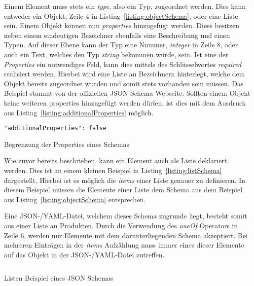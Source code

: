 Einem Element muss stets ein \textit{type}, also ein Typ, zugeordnet werden.
Dies kann entweder ein Objekt, Zeile 4 in Listing~\ref{listing:objectSchema}, oder eine Liste sein.
Einem Objekt können nun \textit{properties} hinzugefügt werden.
Diese besitzen neben einem eindeutigen Bezeichner ebenfalls eine Beschreibung und einen Typen.
Auf dieser Ebene kann der Typ eine Nummer, \textit{integer} in Zeile 8, oder auch ein Text, welches den Typ \textit{string} bekommen würde, sein.
Ist eine der \textit{Properties} ein notwendiges Feld, kann dies mittels des Schlüsselwortes \textit{required} realisiert werden.
Hierbei wird eine Liste an Bezeichnern hinterlegt, welche dem Objekt bereits zugeordnet wurden und somit stets vorhanden sein müssen.
Das Beispiel stammt von der offiziellen JSON Schema Webseite.\cite*{schemaExample}
Sollten einem Objekt keine weiteren properties hinzugefügt werden dürfen, ist dies mit dem Ausdruck aus Listing~\ref{listing:additionalProperties} möglich.

\begin{listing}[!ht]
    \begin{verbatim}
"additionalProperties": false
    \end{verbatim}
    \caption{Begrenzung der Properties eines Schemas}
    \label{listing:additionalProperties}
\end{listing}

Wie zuvor bereits beschrieben, kann ein Element auch als Liste deklariert werden.
Dies ist an einem kleinen Beispiel in Listing~\ref{listing:listSchema} dargestellt.
Hierbei ist es möglich die \textit{items} einer Liste genauer zu definieren.
In diesem Beispiel müssen die Elemente einer Liste dem Schema aus dem Beispiel aus Listing~\ref{listing:objectSchema} entsprechen.

Eine JSON-/YAML-Datei, welchem dieses Schema zugrunde liegt, besteht somit aus einer Liste an Produkten.
Durch die Verwendung des \textit{oneOf} Operators in Zeile 6, werden nur Elemente mit dem darunterliegenden Schema akzeptiert.
Bei mehreren Einträgen in der \textit{items} Aufzählung muss immer eines dieser Elemente auf das Objekt in der JSON-/YAML-Datei zutreffen.

\begin{listing}[!ht]
    \inputminted{json}{listings/2.2.1/list.schema.json}
    \caption{Listen Beispiel eines JSON Schemas}
    \label{listing:listSchema}
\end{listing}

